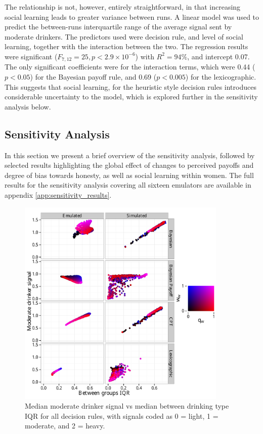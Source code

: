 The relationship is not, however, entirely straightforward, in that increasing social learning leads to greater variance between runs. A linear model was used to predict the between-runs interquartile range of the average signal sent by moderate drinkers. The predictors used were decision rule, and level of social learning, together with the interaction between the two. The regression results were significant (\(F_{7,12}=25,p<2.9\times10^{-6}\)) with \(R^2=94\%\), and intercept 0.07. The only significant coefficients were for the interaction terms, which were 0.44 (\(p<0.05\)) for the Bayesian payoff rule, and 0.69 (\(p<0.005\)) for the lexicographic. This suggests that social learning, for the heuristic style decision rules introduces considerable uncertainty to the model, which is explored further in the sensitivity analysis below.


\subsection{Sensitivity Analysis}
\label{sub:sa_results}

In this section we present a brief overview of the sensitivity analysis, followed by selected results highlighting the global effect of changes to perceived payoffs and degree of bias towards honesty, as well as social learning within women. The full results for the sensitivity analysis covering all sixteen emulators are available in appendix \ref{app:sensitivity_results}.

\begin{figure}[H]
\includegraphics[width=100mm]{figures/sharing_emulated_simulated}
\caption{Median moderate drinker signal vs median between drinking type IQR for all decision rules, with signals coded as 0 = light, 1 = moderate, and 2 = heavy.}
\label{fig:outcome_plots}
\end{figure}

